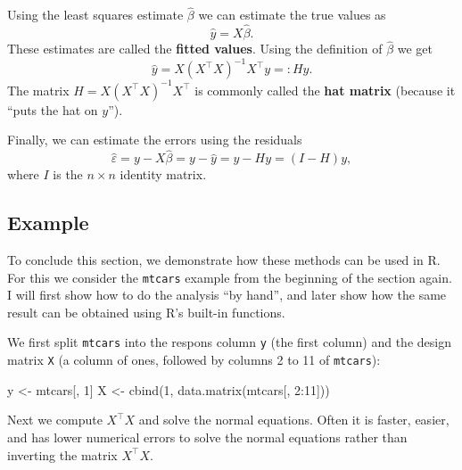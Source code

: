 \documentclass[
  a4paper,
]{article}
\newenvironment{Shaded}{\begin{snugshade}}{\end{snugshade}}
\newcommand{\DecValTok}[1]{\textcolor[rgb]{0.00,0.00,0.81}{#1}}
\newcommand{\FunctionTok}[1]{\textcolor[rgb]{0.00,0.00,0.00}{#1}}
\newcommand{\NormalTok}[1]{#1}
\newcommand{\OtherTok}[1]{\textcolor[rgb]{0.56,0.35,0.01}{#1}}
\newcommand{\SpecialCharTok}[1]{\textcolor[rgb]{0.00,0.00,0.00}{#1}}
\theoremstyle{definition}
\theoremstyle{definition}
\theoremstyle{definition}
\theoremstyle{definition}
\theoremstyle{remark}
\begin{document}
Using the least squares estimate \(\hat\beta\) we can estimate the true
values as
\begin{equation}
  \hat y = X \hat\beta.  \label{eq:fitted-values}
\end{equation}
These estimates are called the \textbf{fitted values}. Using the
definition of \(\hat\beta\) we get
\begin{equation*}
  \hat y
  = X (X^\top X)^{-1} X^\top y
  =: Hy.
\end{equation*}
The matrix \(H = X (X^\top X)^{-1} X^\top\) is commonly called the \textbf{hat
matrix} (because it ``puts the hat on \(y\)'').

Finally, we can estimate the errors using the residuals
\begin{equation}
  \hat\varepsilon
  = y - X \hat\beta
  = y - \hat y
  = y - H y
  = (I - H) y,  \label{eq:fitted-errors}
\end{equation}
where \(I\) is the \(n\times n\) identity matrix.

\hypertarget{example}{%
\subsection{Example}\label{example}}

To conclude this section, we demonstrate how these methods can be used
in R. For this we consider the \texttt{mtcars} example from the beginning of
the section again. I will first show how to do the analysis ``by hand'',
and later show how the same result can be obtained using R's built-in functions.

We first split \texttt{mtcars} into the respons column \texttt{y} (the first column)
and the design matrix \texttt{X} (a column of ones, followed by columns 2 to 11
of \texttt{mtcars}):

\begin{Shaded}
\begin{Highlighting}[]
\NormalTok{y }\OtherTok{\textless{}{-}}\NormalTok{ mtcars[, }\DecValTok{1}\NormalTok{]}
\NormalTok{X }\OtherTok{\textless{}{-}} \FunctionTok{cbind}\NormalTok{(}\DecValTok{1}\NormalTok{, }\FunctionTok{data.matrix}\NormalTok{(mtcars[, }\DecValTok{2}\SpecialCharTok{:}\DecValTok{11}\NormalTok{]))}
\end{Highlighting}
\end{Shaded}

Next we compute \(X^\top X\) and solve the normal equations. Often it is
faster, easier, and has lower numerical errors to solve the normal equations
rather than inverting the matrix \(X^\top X\).
\end{document}

